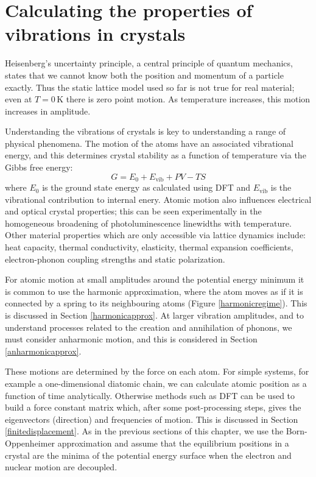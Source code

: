 \section{Calculating the properties of vibrations in crystals} \label{sec:latticedynamics}

Heisenberg's uncertainty principle, a central principle of quantum mechanics, states that we cannot know both the position and momentum of a particle exactly. Thus the static lattice model used so far is not true for real material; even at $T=0\,\textrm{K}$ there is zero point motion. As temperature increases, this motion increases in amplitude.

Understanding the vibrations of crystals is key to understanding a range of physical phenomena. The motion of the atoms have an associated vibrational energy, and this determines crystal stability as a function of temperature via the Gibbs free energy:
\begin{equation}
G = E_0+E_\textrm{vib}+PV-TS
\end{equation}
where $E_0$ is the ground state energy as calculated using DFT and $E_\textrm{vib}$ is the vibrational contribution to internal enery.
Atomic motion also influences electrical and optical crystal properties; this can be seen experimentally in the homogeneous broadening of photoluminescence linewidths with temperature.%
Other material properties which are only accessible via lattice dynamics include: heat capacity, thermal conductivity, elasticity, thermal expansion coefficients, electron-phonon coupling strengths and static polarization.

For atomic motion at small amplitudes around the potential energy minimum it is common to use the harmonic approximation, where the atom moves as if it is connected by a spring to its neighbouring atoms (Figure \ref{harmonicregime}). This is discussed in Section \ref{harmonicapprox}. At larger vibration amplitudes, and to understand processes related to the creation and annihilation of phonons, we must consider anharmonic motion, and this is considered in Section \ref{anharmonicapprox}.

These motions are determined by the force on each atom. For simple systems, for example a one-dimensional diatomic chain, we can calculate atomic position as a function of time analytically. Otherwise methods such as DFT can be used to build a force constant matrix which, after some post-processing steps, gives the eigenvectors (direction) and frequencies of motion. This is discussed in Section \ref{finitedisplacement}. As in the previous sections of this chapter, we use the Born-Oppenheimer approximation and assume that the equilibrium positions in a crystal are the minima of the potential energy surface when the electron and nuclear motion are decoupled.

